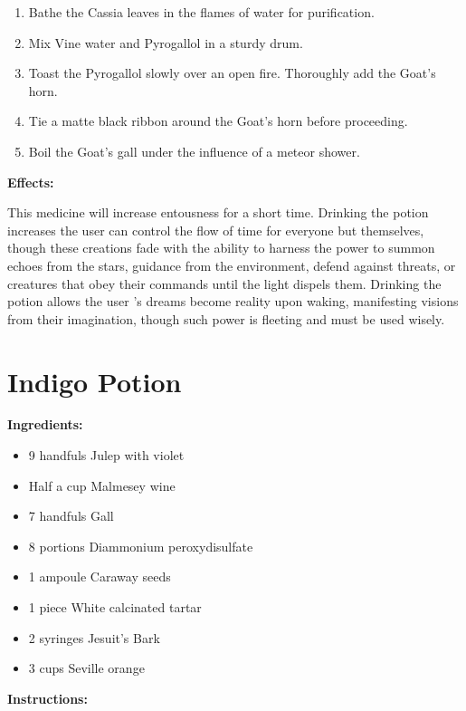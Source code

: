 \documentclass{article}
\begin{document}
\begin{enumerate}
  \item Bathe the Cassia leaves in the flames of water for purification.
  \item Mix Vine water and Pyrogallol in a sturdy drum.
  \item Toast the Pyrogallol slowly over an open fire. Thoroughly add the Goat's horn.
  \item Tie a matte black ribbon around the Goat's horn before proceeding.
  \item Boil the Goat's gall under the influence of a meteor shower.
\end{enumerate}

\textbf{Effects:}

This medicine will increase entousness for a short time. Drinking the potion increases the user can control the flow of time for everyone but themselves, though these creations fade with the ability to harness the power to summon echoes from the stars, guidance from the environment, defend against threats, or creatures that obey their commands until the light dispels them. Drinking the potion allows the user 's dreams become reality upon waking, manifesting visions from their imagination, though such power is fleeting and must be used wisely.

\newpage
\section*{Indigo Potion}

\textbf{Ingredients:}

\begin{itemize}
  \item 9 handfuls Julep with violet
  \item Half a cup Malmesey  wine
  \item 7 handfuls Gall
  \item 8 portions Diammonium peroxydisulfate
  \item 1 ampoule Caraway seeds
  \item 1 piece White calcinated tartar
  \item 2 syringes Jesuit's Bark
  \item 3 cups Seville orange
\end{itemize}

\textbf{Instructions:}
\end{document}
